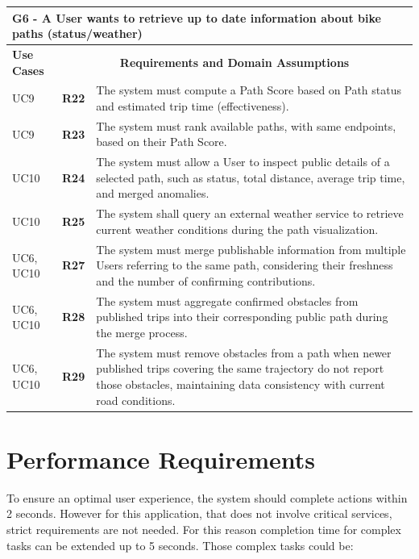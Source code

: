 \begin{longtable}{|p{2.5cm}|p{1cm}|p{10.5cm}|}
\hline
\multicolumn{3}{|p{14.5cm}|}{\centering \textbf{G6 - A User wants to retrieve up to date information about bike paths (status/weather)}} \\
\hline
\textbf{Use Cases} & \multicolumn{2}{c|}{\textbf{Requirements and Domain Assumptions}} \\
\hline
UC9 & \textbf{R22} & The system must compute a Path Score based on Path status and estimated trip time (effectiveness). \\
\hline
UC9 & \textbf{R23} & The system must rank available paths, with same endpoints, based on their Path Score. \\
\hline
UC10 & \textbf{R24} & The system must allow a User to inspect public details of a selected path, such as status, total distance, average trip time, and merged anomalies. \\
\hline
UC10 & \textbf{R25} & The system shall query an external weather service to retrieve current weather conditions during the path visualization. \\
\hline
UC6, UC10 & \textbf{R27} & The system must merge publishable information from multiple Users referring to the same path, considering their freshness and the number of confirming contributions. \\
\hline
UC6, UC10 & \textbf{R28} & The system must aggregate confirmed obstacles from published trips into their corresponding public path during the merge process. \\
\hline
UC6, UC10 & \textbf{R29} & The system must remove obstacles from a path when newer published trips covering the same trajectory do not report those obstacles, maintaining data consistency with current road conditions. \\
\hline
\end{longtable}


\section{Performance Requirements}
\label{sec:performance}

To ensure an optimal user experience, the system should complete actions within 2 seconds. However for this application, that does not involve critical services, strict requirements are not needed. For this reason completion time for complex tasks can be extended up to 5 seconds. Those complex tasks could be:

